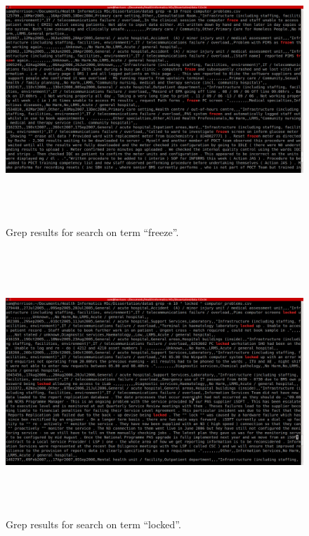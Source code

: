 \begin{figure}[htp]
\centering
\includegraphics[width=15cm,height=10cm]{figs/grepfroze10.png}
\caption{Grep results for search on term ``freeze''.}\label{fig:bugsb}
\end{figure}

\begin{figure}[htp]
\centering
\includegraphics[width=15cm,height=10cm]{figs/greplocked10.png}
\caption{Grep results for search on term ``locked''.}\label{fig:bugsc}
\end{figure}

